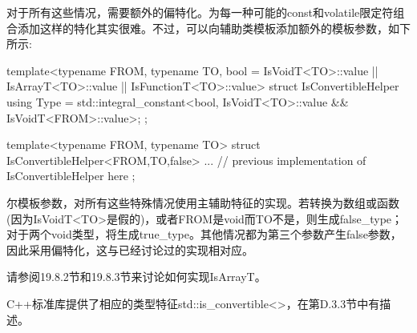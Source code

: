 对于所有这些情况，需要额外的偏特化。为每一种可能的const和volatile限定符组合添加这样的特化其实很难。不过，可以向辅助类模板添加额外的模板参数，如下所示:

\begin{cpp}
template<typename FROM, typename TO, bool = IsVoidT<TO>::value
								|| IsArrayT<TO>::value
								|| IsFunctionT<TO>::value>
struct IsConvertibleHelper {
	using Type = std::integral_constant<bool,
	IsVoidT<TO>::value
	&& IsVoidT<FROM>::value>;
};

template<typename FROM, typename TO>
struct IsConvertibleHelper<FROM,TO,false> {
	... // previous implementation of IsConvertibleHelper here
};
\end{cpp}

尔模板参数，对所有这些特殊情况使用主辅助特征的实现。若转换为数组或函数(因为IsVoidT<TO>是假的)，或者FROM是void而TO不是，则生成false\_type；对于两个void类型，将生成true\_type。其他情况都为第三个参数产生false参数，因此采用偏特化，这与已经讨论过的实现相对应。

请参阅19.8.2节和19.8.3节来讨论如何实现IsArrayT。

C++标准库提供了相应的类型特征std::is\_convertible<>，在第D.3.3节中有描述。



